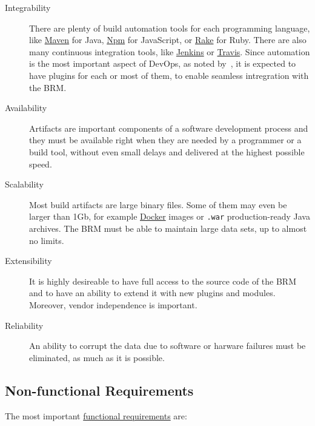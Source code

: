\documentclass[12pt,oneside]{article}
\newcommand\dd[1]{\colorbox{gray!30}{\texttt{#1}}}
\begin{document}
\begin{description}
  \item[Integrability]
  There are plenty of build automation tools for each programming language,
  like \href{https://maven.apache.org/}{Maven} for Java,
  \href{https://www.npmjs.com/}{Npm} for JavaScript, or
  \href{https://github.com/ruby/rake}{Rake} for Ruby.
  There are also many continuous integration tools, like
  \href{https://jenkins.io/}{Jenkins} or \href{https://travis-ci.org/}{Travis}.
  Since automation is the most important aspect of DevOps, as noted by~\textcite{kerzazi2016},
  it is expected to have plugins for each or most of them, to enable seamless
  intregration with the BRM.

  \item[Availability]
  Artifacts are important components of a software development process
  and they must be available right when they are needed by a programmer
  or a build tool, without even small delays and delivered at the highest
  possible speed.

  \item[Scalability]
  Most build artifacts are large binary files. Some of them may even
  be larger than 1Gb, for example \href{https://www.docker.com/}{Docker}
  images or \dd{.war} production-ready Java archives.
  The BRM must be able to maintain large data sets, up to almost no limits.

  \item[Extensibility]
  It is highly desireable to have full access to the source code of the
  BRM and to have an ability to extend it with new plugins and modules. Moreover,
  vendor independence is important.

  \item[Reliability]
  An ability to corrupt the data due to software or harware failures must be
  eliminated, as much as it is possible.
\end{description}

\subsection{Non-functional Requirements}
\label{sec:nfr}

The most important \href{https://en.wikipedia.org/wiki/Functional_requirement}{functional requirements} are:
\end{document}
